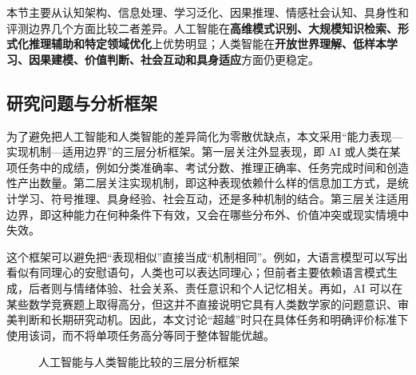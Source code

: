 \documentclass[UTF8,zihao=5,a4paper]{ctexart}
\begin{document}
本节主要从认知架构、信息处理、学习泛化、因果推理、情感社会认知、具身性和评测边界几个方面比较二者差异。人工智能在\textbf{高维模式识别、大规模知识检索、形式化推理辅助和特定领域优化}上优势明显；人类智能在\textbf{开放世界理解、低样本学习、因果建模、价值判断、社会互动和具身适应}方面仍更稳定。

\subsection{研究问题与分析框架}

为了避免把人工智能和人类智能的差异简化为零散优缺点，本文采用“能力表现—实现机制—适用边界”的三层分析框架。第一层关注外显表现，即 AI 或人类在某项任务中的成绩，例如分类准确率、考试分数、推理正确率、任务完成时间和创造性产出数量。第二层关注实现机制，即这种表现依赖什么样的信息加工方式，是统计学习、符号推理、具身经验、社会互动，还是多种机制的结合。第三层关注适用边界，即这种能力在何种条件下有效，又会在哪些分布外、价值冲突或现实情境中失效。

这个框架可以避免把“表现相似”直接当成“机制相同”。例如，大语言模型可以写出看似有同理心的安慰语句，人类也可以表达同理心；但前者主要依赖语言模式生成，后者则与情绪体验、社会关系、责任意识和个人记忆相关。再如，AI 可以在某些数学竞赛题上取得高分，但这并不直接说明它具有人类数学家的问题意识、审美判断和长期研究动机。因此，本文讨论“超越”时只在具体任务和明确评价标准下使用该词，而不将单项任务高分等同于整体智能优越。

\begin{figure}[htbp]
\centering
{}
\caption{人工智能与人类智能比较的三层分析框架}
\label{fig:ai_human_framework}
\end{figure}
\end{document}
